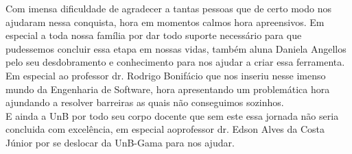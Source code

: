 Com imensa dificuldade de agradecer a tantas pessoas que de certo modo nos ajudaram nessa conquista, hora em momentos calmos hora apreensivos. Em especial a toda nossa família por dar todo suporte necessário para que pudessemos concluir essa etapa em nossas vidas, também aluna Daniela Angellos pelo seu desdobramento e conhecimento para nos ajudar a criar essa ferramenta.\\
Em especial ao professor dr. Rodrigo Bonifácio que nos inseriu nesse imenso mundo da Engenharia de Software, hora apresentando um problemática hora ajundando a resolver barreiras as quais não conseguimos sozinhos.\\
E ainda a UnB por todo seu corpo docente que sem este essa jornada não seria concluida com excelência, em especial aoprofessor dr. Edson Alves da Costa Júnior por se deslocar da UnB-Gama para nos ajudar.\\
